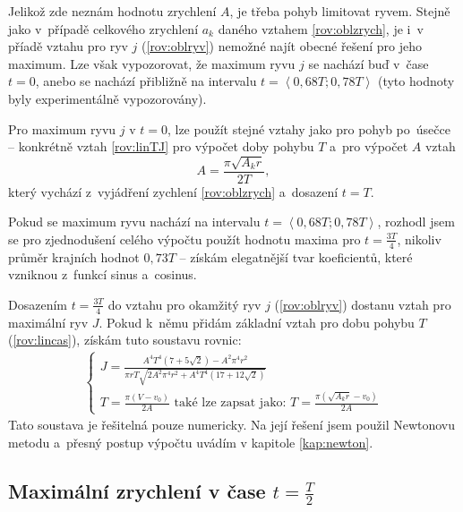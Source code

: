 		Jelikož zde neznám hodnotu zrychlení $A$, je třeba pohyb limitovat ryvem. Stejně jako v~případě celkového zrychlení $a_k$ daného vztahem \ref{rov:oblzrych}, je i~v příadě vztahu pro ryv $j$ (\ref{rov:oblryv}) nemožné najít obecné řešení pro jeho maximum. Lze však vypozorovat, že maximum ryvu $j$ se nachází buď v~čase $t=0$, anebo se nachází přibližně na intervalu $t=\left\langle 0,68T; 0,78T\right\rangle$ (tyto hodnoty byly experimentálně vypozorovány).
		
		Pro maximum ryvu $j$ v $t=0$, lze použít stejné vztahy jako pro pohyb po~úsečce -- konkrétně vztah \ref{rov:linTJ} pro výpočet doby pohybu $T$ a~pro výpočet $A$ vztah
		\begin{equation}\label{rov:oblA}
			A = \frac{\pi\sqrt{A_k r}}{2T},
		\end{equation}
		který vychází z~vyjádření zychlení \ref{rov:oblzrych} a~dosazení $t=T$.
		
		Pokud se maximum ryvu nachází na intervalu $t=\left\langle 0,68T; 0,78T\right\rangle$, rozhodl jsem se pro zjednodušení celého výpočtu použít hodnotu maxima pro $t=\frac{3T}{4}$, nikoliv průměr krajních hodnot $0,73T$ -- získám elegatnější tvar koeficientů, které vzniknou z~funkcí sinus a~cosinus.
		
		Dosazením $t=\frac{3T}{4}$ do vztahu pro okamžitý ryv $j$ (\ref{rov:oblryv}) dostanu vztah pro maximální ryv $J$. Pokud k~němu přidám základní vztah pro dobu pohybu $T$ (\ref{rov:lincas}), získám tuto soustavu rovnic:
		\begin{eqnarray}
			\label{rov:oblJT}
			\begin{cases}
			J=\frac{A^4T^4\left(7+5\sqrt{2}\right)-A^2\pi^4r^2}{\pi rT\sqrt{2A^2\pi^4r^2+A^4T^4\left(17+12\sqrt{2}\right)}} \\
			T=\frac{\pi(V-v_0)}{2A}\text{ také lze zapsat jako: }T=\frac{\pi(\sqrt{A_k r}-v_0)}{2A}
			\end{cases}
		\end{eqnarray}
		Tato soustava je řešitelná pouze numericky. Na její řešení jsem použil Newtonovu metodu a~přesný postup výpočtu uvádím v kapitole \ref{kap:newton}.
		
		\subsection{Maximální zrychlení v čase $t=\frac{T}{2}$}\label{kap:maxT2}
		
